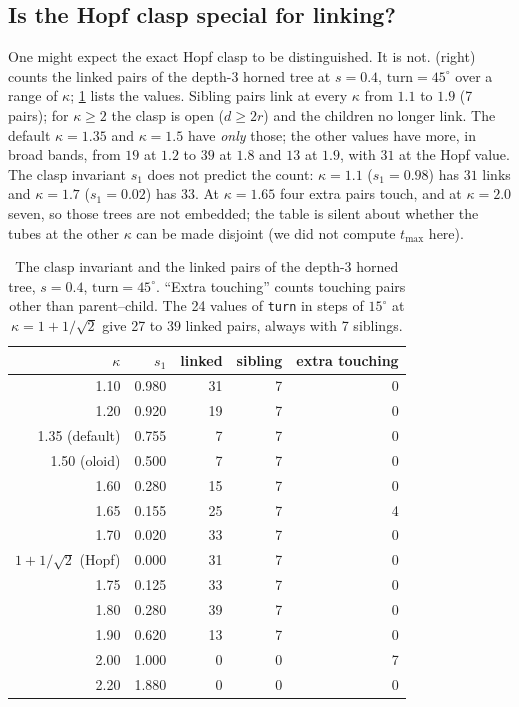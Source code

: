 \documentclass[11pt,a4paper]{article}
\theoremstyle{remark}
\newcommand{\code}[1]{\texttt{#1}}
\begin{document}
\subsection{Is the Hopf clasp special for linking?}

One might expect the exact Hopf clasp to be distinguished.  It is not.   (right) counts the linked pairs of the depth-3 horned tree at $s=0.4$, $\text{turn}=45^\circ$ over a range of $\kappa$; \cref{tab:clasp} lists the values.  Sibling pairs link at every $\kappa$ from $1.1$ to $1.9$ (7 pairs); for $\kappa\ge2$ the clasp is open ($d\ge2r$) and the children no longer link.  The default $\kappa=1.35$ and $\kappa=1.5$ have \emph{only} those; the other values have more, in broad bands, from $19$ at $1.2$ to $39$ at $1.8$ and $13$ at $1.9$, with $31$ at the Hopf value.  The clasp invariant $s_1$ does not predict the count: $\kappa=1.1$ ($s_1=0.98$) has $31$ links and $\kappa=1.7$ ($s_1=0.02$) has $33$.  At $\kappa=1.65$ four extra pairs touch, and at $\kappa=2.0$ seven, so those trees are not embedded; the table is silent about whether the tubes at the other $\kappa$ can be made disjoint (we did not compute $t_{\max}$ here).

\begin{table}[t]
\centering\footnotesize
\begin{tabular}{@{}rrrrr@{}}
\toprule
$\kappa$ & $s_1$ & linked & sibling & extra touching \\ \midrule
1.10 & 0.980 & 31 & 7 & 0 \\
1.20 & 0.920 & 19 & 7 & 0 \\
1.35 (default) & 0.755 & 7 & 7 & 0 \\
1.50 (oloid) & 0.500 & 7 & 7 & 0 \\
1.60 & 0.280 & 15 & 7 & 0 \\
1.65 & 0.155 & 25 & 7 & 4 \\
1.70 & 0.020 & 33 & 7 & 0 \\
$1+1/\sqrt2$ (Hopf) & 0.000 & 31 & 7 & 0 \\
1.75 & 0.125 & 33 & 7 & 0 \\
1.80 & 0.280 & 39 & 7 & 0 \\
1.90 & 0.620 & 13 & 7 & 0 \\
2.00 & 1.000 & 0 & 0 & 7 \\
2.20 & 1.880 & 0 & 0 & 0 \\ \bottomrule
\end{tabular}
\caption{The clasp invariant and the linked pairs of the depth-3 horned tree, $s=0.4$, $\text{turn}=45^\circ$.  ``Extra touching'' counts touching pairs other than parent--child.  The 24 values of \code{turn} in steps of $15^\circ$ at $\kappa=1+1/\sqrt2$ give 27 to 39 linked pairs, always with 7 siblings.}
\label{tab:clasp}
\end{table}
\end{document}

